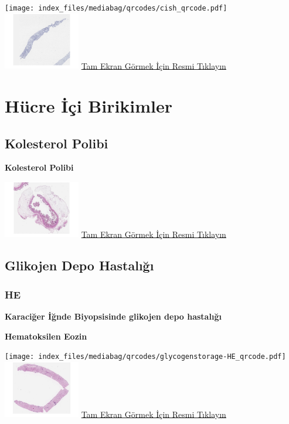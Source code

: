 \documentclass[
  letterpaper,
  DIV=11,
  numbers=noendperiod]{scrreprt}
\begin{document}
\texttt{[image: index\_files/mediabag/qrcodes/cish\_qrcode.pdf]}
\href{https://images.patolojiatlasi.com/her2-cish/cish.html}{\includegraphics[width=0.25\textwidth,height=\textheight]{./screenshots/thumbnail_cish.png}}
\href{https://images.patolojiatlasi.com/her2-cish/cish.html}{Tam Ekran
Görmek İçin Resmi Tıklayın}

\chapter{Hücre İçi Birikimler}\label{sec-hucre-ici-birikimler}

\section{Kolesterol Polibi}\label{sec-kolesterol-polibi}

\textbf{Kolesterol Polibi}

\href{https://images.patolojiatlasi.com/cholesterolpolyp/HE.html}{\includegraphics[width=0.25\textwidth,height=\textheight]{./screenshots/thumbnail_cholesterolpolyp.png}}
\href{https://images.patolojiatlasi.com/cholesterolpolyp/HE.html}{Tam
Ekran Görmek İçin Resmi Tıklayın}

\section{Glikojen Depo Hastalığı}\label{sec-glikojen-depo-hastaligi}

\subsection{HE}\label{he}

\textbf{Karaciğer İğnde Biyopsisinde glikojen depo hastalığı}

\textbf{Hematoksilen Eozin}

\texttt{[image: index\_files/mediabag/qrcodes/glycogenstorage-HE\_qrcode.pdf]}
\href{https://images.patolojiatlasi.com/glycogenstorage/HE.html}{\includegraphics[width=0.25\textwidth,height=\textheight]{./screenshots/thumbnail_glycogenstorage-HE.png}}
\href{https://images.patolojiatlasi.com/glycogenstorage/HE.html}{Tam
Ekran Görmek İçin Resmi Tıklayın}
\end{document}
